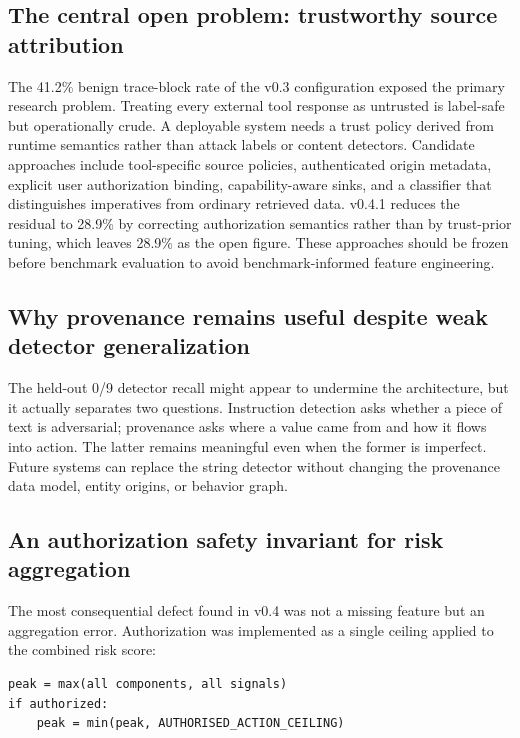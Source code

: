 \documentclass[letterpaper,twocolumn,10pt]{article}
\begin{document}
\subsection{The central open problem: trustworthy source attribution}
\label{sec:disc:trust}

The 41.2\% benign trace-block rate of the v0.3 configuration exposed the primary
research problem. Treating every external tool response as untrusted is
label-safe but operationally crude. A deployable system needs a trust policy
derived from runtime semantics rather than attack labels or content detectors.
Candidate approaches include tool-specific source policies, authenticated origin
metadata, explicit user authorization binding, capability-aware sinks, and a
classifier that distinguishes imperatives from ordinary retrieved data. v0.4.1
reduces the residual to 28.9\% by correcting authorization semantics rather than
by trust-prior tuning, which leaves 28.9\% as the open figure. These approaches
should be frozen before benchmark evaluation to avoid benchmark-informed feature
engineering.

\subsection{Why provenance remains useful despite weak detector generalization}
\label{sec:disc:detector}

The held-out 0/9 detector recall might appear to undermine the architecture, but
it actually separates two questions. Instruction detection asks whether a piece
of text is adversarial; provenance asks where a value came from and how it flows
into action. The latter remains meaningful even when the former is imperfect.
Future systems can replace the string detector without changing the provenance
data model, entity origins, or behavior graph.

\subsection{An authorization safety invariant for risk aggregation}
\label{sec:invariant}

The most consequential defect found in v0.4 was not a missing feature but an
aggregation error. Authorization was implemented as a single ceiling applied to
the combined risk score:

{\small
\begin{verbatim}
peak = max(all components, all signals)
if authorized:
    peak = min(peak, AUTHORISED_ACTION_CEILING)
\end{verbatim}
}
\end{document}
